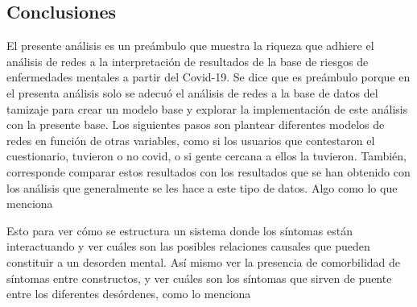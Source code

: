 \documentclass[11pt,spanish]{article}\usepackage[]{graphicx}\usepackage[]{color}
\begin{document}
\clearpage

\subsection{Conclusiones}

El presente análisis es un preámbulo que muestra la riqueza que adhiere el análisis de redes a la interpretación de resultados de la base de riesgos de enfermedades mentales a partir del Covid-19. Se dice que es preámbulo porque en el presenta análisis solo se adecuó el análisis de redes a la base de datos del tamizaje para crear un modelo base y explorar la implementación de este análisis con la presente base. Los siguientes pasos son plantear diferentes modelos de redes en función de otras variables, como si los usuarios que contestaron el cuestionario, tuvieron o no covid, o si gente cercana a ellos la tuvieron. También, corresponde comparar estos resultados con los resultados que se han obtenido con los análisis que generalmente se les hace a este tipo de datos. Algo como lo que menciona \cite{haslbeck2017predictable} 

Esto para ver cómo se estructura un sistema donde los síntomas están interactuando y ver cuáles son las posibles relaciones causales que pueden constituir a un desorden mental. Así mismo ver la presencia de comorbilidad de síntomas entre constructos, y ver cuáles son los síntomas que sirven de puente entre los diferentes desórdenes, como lo menciona \cite{fried2017mental}
\end{document}
